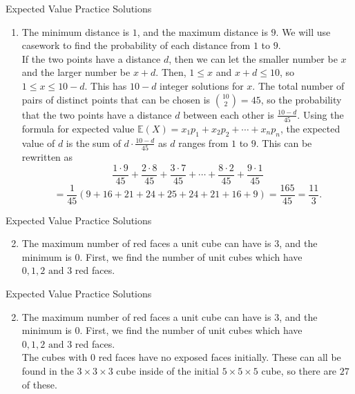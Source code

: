 \documentclass[9pt]{beamer}
\begin{document}
\begin{frame}[t]{Expected Value Practice Solutions}
    \begin{enumerate}
        \item The minimum distance is $1$, and the maximum distance is $9$. We will use casework to find the probability of each distance from $1$ to $9$.\\
        \bigskip
        If the two points have a distance $d$, then we can let the smaller number be $x$ and the larger number be $x+d$. Then, $1\le x$ and $x+d\le 10$, so $1\le x\le 10-d$. This has $10-d$ integer solutions for $x$. The total number of pairs of distinct points that can be chosen is $\binom{10}{2}=45$, so the probability that the two points have a distance $d$ between each other is $\frac{10-d}{45}$. Using the formula for expected value $\mathbb{E}(X)=x_1p_1+x_2p_2+\cdots+x_np_n$, the expected value of $d$ is the sum of $d\cdot\frac{10-d}{45}$ as $d$ ranges from $1$ to $9$. This can be rewritten as
        $$\frac{1\cdot9}{45}+\frac{2\cdot8}{45}+\frac{3\cdot7}{45}+\cdots+\frac{8\cdot2}{45}+\frac{9\cdot1}{45}$$
        $$=\frac{1}{45}\left(9+16+21+24+25+24+21+16+9\right)=\frac{165}{45}=\frac{11}{3}.$$
    \end{enumerate}
    
\end{frame}





\begin{frame}[t]{Expected Value Practice Solutions}
    \begin{enumerate}
    \setcounter{enumi}{1}
        \item The maximum number of red faces a unit cube can have is $3$, and the minimum is $0$. First, we find the number of unit cubes which have $0,1,2\text{ and } 3$ red faces.\\
        \bigskip
        
    \end{enumerate}
    
\end{frame}

\begin{frame}[t]{Expected Value Practice Solutions}
    \begin{enumerate}
    \setcounter{enumi}{1}
        \item The maximum number of red faces a unit cube can have is $3$, and the minimum is $0$. First, we find the number of unit cubes which have $0,1,2\text{ and } 3$ red faces.\\
        \bigskip
        The cubes with $0$ red faces have no exposed faces initially. These can all be found in the $3\times3\times3$ cube inside of the initial $5\times5\times5$ cube, so there are $27$ of these.\\
        
    \end{enumerate}
    
\end{frame}
\end{document}
